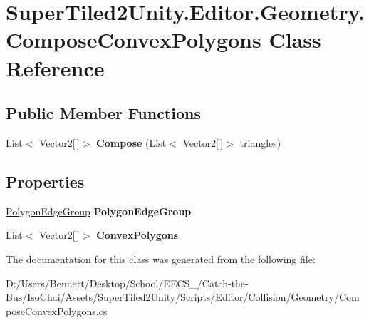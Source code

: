 \hypertarget{class_super_tiled2_unity_1_1_editor_1_1_geometry_1_1_compose_convex_polygons}{}\section{Super\+Tiled2\+Unity.\+Editor.\+Geometry.\+Compose\+Convex\+Polygons Class Reference}
\label{class_super_tiled2_unity_1_1_editor_1_1_geometry_1_1_compose_convex_polygons}
\subsection*{Public Member Functions}
\begin{DoxyCompactItemize}
\item 
\mbox{\label{class_super_tiled2_unity_1_1_editor_1_1_geometry_1_1_compose_convex_polygons_ab2ad37b19a9c0219c14502fd2c49b409}} 
List$<$ Vector2\mbox{[}$\,$\mbox{]}$>$ {\bfseries Compose} (List$<$ Vector2\mbox{[}$\,$\mbox{]}$>$ triangles)
\end{DoxyCompactItemize}
\subsection*{Properties}
\begin{DoxyCompactItemize}
\item 
\mbox{\label{class_super_tiled2_unity_1_1_editor_1_1_geometry_1_1_compose_convex_polygons_a0ed9adff0f29e3a2a2ad71af51a55fd3}} 
\mbox{\hyperlink{class_super_tiled2_unity_1_1_editor_1_1_geometry_1_1_polygon_edge_group}{Polygon\+Edge\+Group}} {\bfseries Polygon\+Edge\+Group}
\item 
\mbox{\label{class_super_tiled2_unity_1_1_editor_1_1_geometry_1_1_compose_convex_polygons_a1dcc8acf648761370ebffdf47834e985}} 
List$<$ Vector2\mbox{[}$\,$\mbox{]}$>$ {\bfseries Convex\+Polygons}
\end{DoxyCompactItemize}


The documentation for this class was generated from the following file\+:\begin{DoxyCompactItemize}
\item 
D\+:/\+Users/\+Bennett/\+Desktop/\+School/\+E\+E\+C\+S\+\_/\+Catch-\/the-\/\+Bus/\+Iso\+Chai/\+Assets/\+Super\+Tiled2\+Unity/\+Scripts/\+Editor/\+Collision/\+Geometry/Compose\+Convex\+Polygons.\+cs\end{DoxyCompactItemize}
